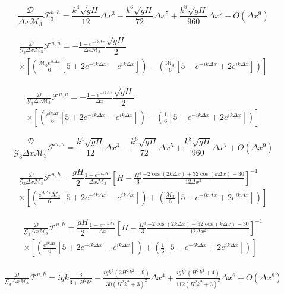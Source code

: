 \documentclass[12pt]{article}
\begin{document}
\[\frac{\mathcal{D}}{\Delta x\mathcal{M}_3}\mathcal{F}_3^{h,h} = \frac{ k^4 \sqrt{gH}}{12} \Delta x^3 - \frac{k^6 \sqrt{gH}}{72}\Delta x^5 + \frac{k^8 \sqrt{gH}}{960}\Delta x^7 + O(\Delta x ^{9})\]

\begin{multline*}
\frac{\mathcal{D}}{\mathcal{G}_3\Delta x\mathcal{M}_3}\mathcal{F}^{u,u} = - \frac{1 -e^{-ik\Delta x}}{\Delta x \mathcal{M}_3} \dfrac{ \sqrt{gH}}{ 2}  \\ \times \left [ \left(\frac{\mathcal{M}_3 e^{ik\Delta x }}{6}\left[5 + 2e^{-ik\Delta x} - e^{ik\Delta x} \right]\right)- \left(\frac{\mathcal{M}_3}{6}\left[5  - e^{-ik\Delta x} + 2e^{ik\Delta x} \right]\right) \right ]
\end{multline*}

\begin{multline*}
\frac{\mathcal{D}}{\mathcal{G}_3\Delta x\mathcal{M}_3}\mathcal{F}^{u,u} = - \frac{1 -e^{-ik\Delta x}}{\Delta x } \dfrac{ \sqrt{gH}}{ 2}  \\ \times \left [ \left(\frac{e^{ik\Delta x }}{6}\left[5 + 2e^{-ik\Delta x} - e^{ik\Delta x} \right]\right)- \left(\frac{1}{6}\left[5  - e^{-ik\Delta x} + 2e^{ik\Delta x} \right]\right) \right ]
\end{multline*}

\[\frac{\mathcal{D}}{\mathcal{G}_3\Delta x\mathcal{M}_3}\mathcal{F}^{u,u} = \frac{ k^4 \sqrt{gH}}{12} \Delta x^3 - \frac{k^6 \sqrt{gH}}{72}\Delta x^5 + \frac{k^8 \sqrt{gH}}{960}\Delta x^7 + O(\Delta x ^{9})\]

\begin{multline*}
\frac{\mathcal{D}}{\mathcal{G}_3\Delta x\mathcal{M}_3}\mathcal{F}^{u,h} = \dfrac{ gH}{ 2} \frac{1 -e^{-ik\Delta x}}{\Delta x \mathcal{M}_3} \left[H -\frac{H^3}{3} \frac{-2\cos\left(2k\Delta x\right) + 32\cos\left(k\Delta x\right)  - 30 }{12\Delta x^2}\right]^{-1} \\ \times \left [ \left(\frac{e^{ik\Delta x } \mathcal{M}_3}{6}\left[5 + 2e^{-ik\Delta x} - e^{ik\Delta x} \right]\right) +  \left(\frac{\mathcal{M}_3}{6}\left[5  - e^{-ik\Delta x} + 2e^{ik\Delta x} \right]\right) \right ]
\end{multline*}

\begin{multline*}
\frac{\mathcal{D}}{\mathcal{G}_3\Delta x\mathcal{M}_3}\mathcal{F}^{u,h} = \dfrac{ gH}{ 2} \frac{1 -e^{-ik\Delta x}}{\Delta x} \left[H -\frac{H^3}{3} \frac{-2\cos\left(2k\Delta x\right) + 32\cos\left(k\Delta x\right)  - 30 }{12\Delta x^2}\right]^{-1} \\ \times \left [ \left(\frac{e^{ik\Delta x }}{6}\left[5 + 2e^{-ik\Delta x} - e^{ik\Delta x} \right]\right) +  \left(\frac{1}{6}\left[5  - e^{-ik\Delta x} + 2e^{ik\Delta x} \right]\right) \right ]
\end{multline*}

\begin{multline*}
\frac{\mathcal{D}}{\mathcal{G}_3\Delta x\mathcal{M}_3}\mathcal{F}^{u,h} = igk\frac{3}{3 + H^2k^2} - \frac{igk^5\left(2H^2k^2 + 9\right)}{30\left(H^2k^2 + 3\right)^2}\Delta x^4 + \frac{igk^7\left(H^2k^2 + 4\right)}{112\left(H^2k^2 + 3\right)^2}\Delta x^6 + O(\Delta x ^8)
\end{multline*}
\end{document}
